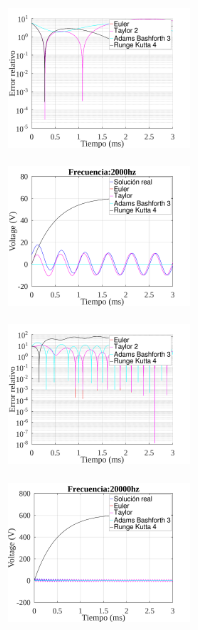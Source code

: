 \documentclass[letterpaper, 10 pt, conference]{ieeeconf}  %
\begin{document}
\begin{figure}[H]
\centering
\includegraphics[width=0.43\textwidth]{../plots/ej5/error-200hz.png}
\label{fig:fig}
\end{figure}

\begin{figure}[H]
\centering
\includegraphics[width=0.43\textwidth]{../plots/ej5/Frecuencia:2000hz.png}
\label{fig:fig}
\end{figure}

\begin{figure}[H]
\centering
\includegraphics[width=0.43\textwidth]{../plots/ej5/error-2000hz.png}
\label{fig:fig}
\end{figure}

\begin{figure}[H]
\centering
\includegraphics[width=0.43\textwidth]{../plots/ej5/Frecuencia:20000hz.png}
\label{fig:fig}
\end{figure}
\end{document}
